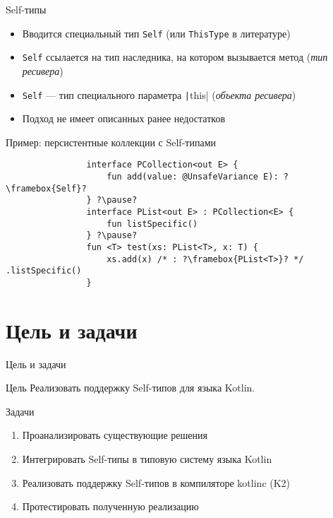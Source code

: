 \documentclass[handout,aspectratio=169,usenames,dvipsnames]{beamer}
\begin{document}
    \begin{frame}[fragile]{Self-типы}

        \begin{itemize}
            \item Вводится специальный тип \texttt{Self} (или \texttt{ThisType} в литературе)
            \item \texttt{Self} ссылается на тип наследника, на котором вызывается метод (\emph{тип ресивера})
            \item \texttt{Self} --- тип специального параметра \texttt|this| (\emph{объекта ресивера})
            \item Подход не имеет описанных ранее недостатков
        \end{itemize}

        \pause

        \begin{block}{Пример: персистентные коллекции с Self-типами}
            \begin{verbatim}
                interface PCollection<out E> {
                    fun add(value: @UnsafeVariance E): ?\framebox{Self}?
                } ?\pause?
                interface PList<out E> : PCollection<E> {
                    fun listSpecific()
                } ?\pause?
                fun <T> test(xs: PList<T>, x: T) {
                    xs.add(x) /* : ?\framebox{PList<T>}? */ .listSpecific()
                }
            \end{verbatim}
        \end{block}
    \end{frame}


    \section{Цель и задачи}

    \begin{frame}[fragile]{Цель и задачи}

        \begin{block}{Цель}
            Реализовать поддержку Self-типов для языка Kotlin.
        \end{block}

        \begin{block}{Задачи}
            \begin{enumerate}
                \item Проанализировать существующие решения
                \item Интегрировать Self-типы в типовую систему языка Kotlin
                \item Реализовать поддержку Self-типов в компиляторе kotlinc (K2)
                \item Протестировать полученную реализацию
            \end{enumerate}
        \end{block}
    \end{frame}
\end{document}
